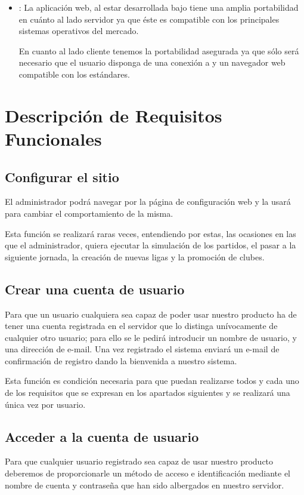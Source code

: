 \begin{itemize}
\item {}: La aplicación web, al estar desarrollada bajo
   tiene una amplia portabilidad en cuánto al lado
  servidor ya que éste es compatible con los principales sistemas operativos del
  mercado.

  En cuanto al lado cliente tenemos la portabilidad asegurada ya que sólo será
  necesario que el usuario disponga de una conexión a  y un
  navegador web compatible con los estándares.
\end{itemize}

\section{Descripción de Requisitos Funcionales}

\subsection*{Configurar el sitio}
El administrador podrá navegar por la página de configuración web y la usará
para cambiar el comportamiento de la misma.

Esta función se realizará raras veces, entendiendo por estas, las ocasiones en
las que el administrador, quiera ejecutar la simulación de los partidos, el
pasar a la siguiente jornada, la creación de nuevas ligas y la promoción de clubes.
\subsection*{Crear una cuenta de usuario}
Para que un usuario cualquiera sea capaz de poder usar nuestro producto ha de
tener una cuenta registrada en el servidor que lo distinga unívocamente de
cualquier otro usuario; para ello se le pedirá introducir un nombre de usuario,
y una dirección de e-mail. Una vez registrado el sistema enviará un e-mail de
confirmación de registro dando la bienvenida a nuestro sistema.

Esta función es condición necesaria para que puedan realizarse todos y cada uno
de los requisitos que se expresan en los apartados siguientes y se realizará una
única vez por usuario.

\subsection*{Acceder a la cuenta de usuario}
Para que cualquier usuario registrado sea capaz de usar nuestro producto
deberemos de proporcionarle un método de acceso e identificación mediante el
nombre de cuenta y contraseña que han sido albergados en nuestro servidor.

